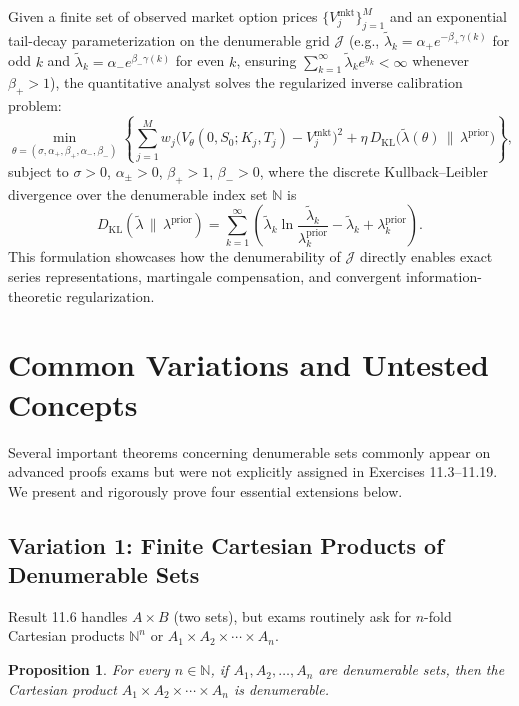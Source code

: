 \documentclass[11pt, letterpaper]{article}
\newtheorem{proposition}[theorem]{Proposition}
\theoremstyle{definition}
\theoremstyle{remark}
\begin{document}
Given a finite set of observed market option prices $\{V^{\text{mkt}}_j\}_{j=1}^{M}$ and an exponential tail-decay parameterization on the denumerable grid $\mathcal{J}$ (e.g., $\tilde{\lambda}_k = \alpha_+ e^{-\beta_+ \gamma(k)}$ for odd $k$ and $\tilde{\lambda}_k = \alpha_- e^{\beta_- \gamma(k)}$ for even $k$, ensuring $\sum_{k=1}^{\infty} \tilde{\lambda}_k e^{y_k} < \infty$ whenever $\beta_+ > 1$), the quantitative analyst solves the regularized inverse calibration problem:
\[
\min_{\theta = (\sigma, \alpha_+, \beta_+, \alpha_-, \beta_-)} \left\{ \sum_{j=1}^{M} w_j \bigl(V_{\theta}(0, S_0; K_j, T_j) - V^{\text{mkt}}_j\bigr)^2 + \eta\, D_{\mathrm{KL}}\bigl(\tilde{\lambda}(\theta) \,\|\, \lambda^{\text{prior}}\bigr) \right\},
\]
subject to $\sigma > 0$, $\alpha_{\pm} > 0$, $\beta_+ > 1$, $\beta_- > 0$, where the discrete Kullback--Leibler divergence over the denumerable index set $\mathbb{N}$ is
\[
D_{\mathrm{KL}}(\tilde{\lambda} \,\|\, \lambda^{\text{prior}}) = \sum_{k=1}^{\infty} \left( \tilde{\lambda}_k \ln\frac{\tilde{\lambda}_k}{\lambda_k^{\text{prior}}} - \tilde{\lambda}_k + \lambda_k^{\text{prior}} \right).
\]
This formulation showcases how the denumerability of $\mathcal{J}$ directly enables exact series representations, martingale compensation, and convergent information-theoretic regularization.

\section{Common Variations and Untested Concepts}

Several important theorems concerning denumerable sets commonly appear on advanced proofs exams but were not explicitly assigned in Exercises 11.3--11.19. We present and rigorously prove four essential extensions below.

\subsection{Variation 1: Finite Cartesian Products of Denumerable Sets}

Result 11.6 handles $A \times B$ (two sets), but exams routinely ask for $n$-fold Cartesian products $\mathbb{N}^n$ or $A_1 \times A_2 \times \cdots \times A_n$.

\begin{proposition}
For every $n \in \mathbb{N}$, if $A_1, A_2, \dots, A_n$ are denumerable sets, then the Cartesian product $A_1 \times A_2 \times \cdots \times A_n$ is denumerable.
\end{proposition}
\end{document}
